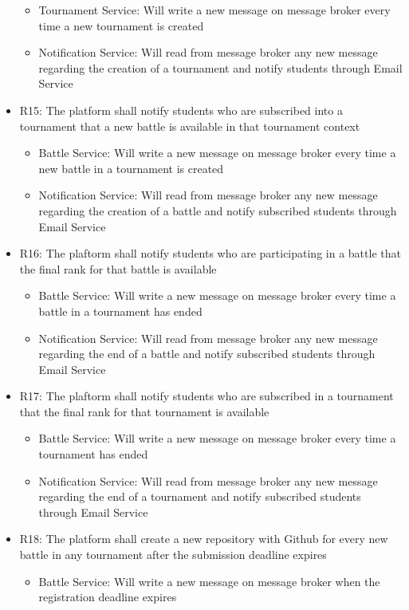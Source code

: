 \begin{itemize}
\begin{itemize}
\item Tournament Service: Will write a new message on message broker every time a new tournament is created
\item Notification Service: Will read from message broker any new message regarding the creation of a tournament and notify students through Email Service
\end{itemize}
\item R15: The platform shall notify students who are subscribed into a tournament that a new battle is available in that tournament context
\begin{itemize}
\item Battle Service: Will write a new message on message broker every time a new battle in a tournament is created
\item Notification Service: Will read from message broker any new message regarding the creation of a battle and notify subscribed students through Email Service
\end{itemize}
\item R16: The plaftorm shall notify students who are participating in a battle that the final rank for that battle is available
\begin{itemize}
\item Battle Service: Will write a new message on message broker every time a battle in a tournament has ended
\item Notification Service: Will read from message broker any new message regarding the end of a battle and notify subscribed students through Email Service
\end{itemize}
\item R17: The plaftorm shall notify students who are subscribed in a tournament that the final rank for that tournament is available
\begin{itemize}
\item Battle Service: Will write a new message on message broker every time a tournament has ended
\item Notification Service: Will read from message broker any new message regarding the end of a tournament and notify subscribed students through Email Service
\end{itemize}
\item R18: The platform shall create a new repository with Github for every new battle in any tournament after the submission deadline expires
\begin{itemize}
\item Battle Service: Will write a new message on message broker when the registration deadline expires

\end{itemize}
\end{itemize}
